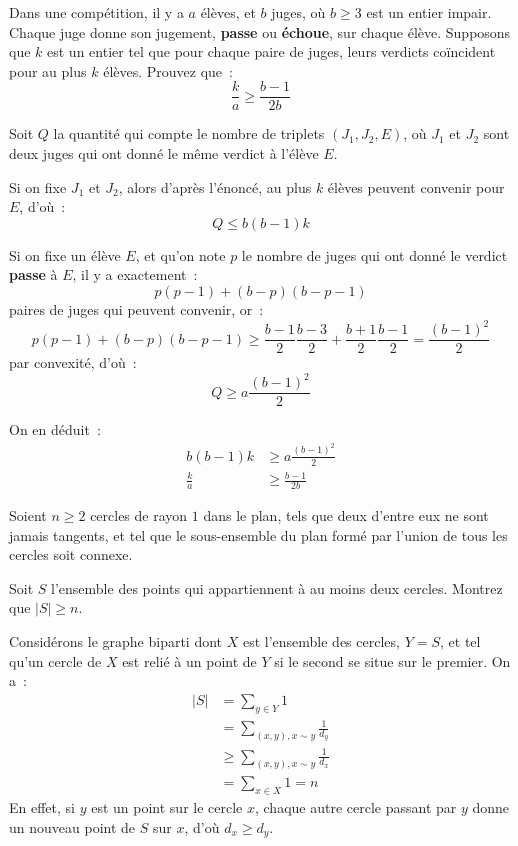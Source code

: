 \begin{exo}[P2 IMO 1998]
	Dans une compétition, il y a $a$ élèves, et $b$ juges, où $b \geq 3$ est un entier impair. Chaque juge donne son jugement, \textbf{passe} ou \textbf{échoue}, sur chaque élève. Supposons que $k$ est un entier tel que pour chaque paire de juges, leurs verdicts coïncident pour au plus $k$ élèves. Prouvez que~:
	$$\frac{k}{a} \geq \frac{b - 1}{2b}$$
\end{exo}
\begin{sol}
	Soit $Q$ la quantité qui compte le nombre de triplets $(J_1, J_2, E)$, où $J_1$ et $J_2$ sont deux juges qui ont donné le même verdict à l'élève $E$.
	
	Si on fixe $J_1$ et $J_2$, alors d'après l'énoncé, au plus $k$ élèves peuvent convenir pour $E$, d'où~:
	$$Q \leq b(b - 1)k$$
	
	Si on fixe un élève $E$, et qu'on note $p$ le nombre de juges qui ont donné le verdict \textbf{passe} à $E$, il y a exactement~:
	$$p(p - 1) + (b - p)(b - p - 1)$$
	paires de juges qui peuvent convenir, or~:
	$$p(p - 1) + (b - p)(b - p - 1) \geq \frac{b - 1}2\frac{b - 3}2 + \frac{b + 1}2\frac{b - 1}2 = \frac{(b - 1)^2}2$$
	par convexité, d'où~:
	$$Q \geq a\frac{(b - 1)^2}2$$
	
	On en déduit~:
	\begin{align*}
		b(b - 1)k &\geq a\frac{(b - 1)^2}2 \\
		\frac{k}{a} &\geq \frac{b - 1}{2b}
	\end{align*}
\end{sol}

\begin{exo}[Iran 1999]
	Soient $n \geq 2$ cercles de rayon $1$ dans le plan, tels que deux d'entre eux ne sont jamais tangents, et tel que le sous-ensemble du plan formé par l'union de tous les cercles soit connexe.
	
	Soit $S$ l'ensemble des points qui appartiennent à au moins deux cercles.
	Montrez que $|S| \geq n$.
\end{exo}
\begin{sol}
	Considérons le graphe biparti dont $X$ est l'ensemble des cercles, $Y = S$, et tel qu'un cercle de $X$ est relié à un point de $Y$ si le second se situe sur le premier.
	On a~:
	\begin{align*}
	|S| &= \sum_{y \in Y} 1 \\
	&= \sum_{(x, y), x \sim y} \frac1{d_y} \\
	&\geq \sum_{(x, y), x \sim y} \frac1{d_x} \\
	&= \sum_{x \in X} 1 = n
	\end{align*}
	En effet, si $y$ est un point sur le cercle $x$, chaque autre cercle passant par $y$ donne un nouveau point de $S$ sur $x$, d'où $d_x \geq d_y$.
\end{sol}
